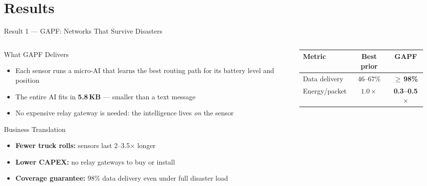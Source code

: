 \documentclass[aspectratio=169,t,10pt]{beamer}
\begin{document}
\section{Results}

\begin{frame}[shrink=5]{Result 1 --- GAPF: Networks That Survive Disasters}
\begin{columns}[T]
\begin{column}{0.50\textwidth}
  \begin{block}{\faBolt\; What GAPF Delivers}
    \begin{itemize}\small\setlength{\itemsep}{3pt}
      \item Each sensor runs a micro-AI that learns
            the best routing path for its battery level and position
      \item The entire AI fits in \textbf{5.8\,KB} ---
            smaller than a text message
      \item No expensive relay gateway is needed:
            the intelligence lives \emph{on} the sensor
    \end{itemize}
  \end{block}
  \vspace{3pt}
  \begin{exampleblock}{\faBriefcase\; Business Translation}
    \begin{itemize}\small\setlength{\itemsep}{2pt}
      \item \textbf{Fewer truck rolls:} sensors last 2--3.5$\times$ longer
      \item \textbf{Lower CAPEX:} no relay gateways to buy or install
      \item \textbf{Coverage guarantee:} 98\% data delivery
            even under full disaster load
    \end{itemize}
  \end{exampleblock}
\end{column}
\begin{column}{0.47\textwidth}
  \centering\small
  \renewcommand{\arraystretch}{1.35}
  \begin{tabular}{lcc}
    \toprule
    \textbf{Metric} & \textbf{Best prior} & \textbf{GAPF} \\
    \midrule
    Data delivery   & 46--67\%      & \textbf{$\geq$\,98\%} \\
    Energy/packet   & $1.0\times$   & \textbf{0.3--0.5$\times$} \\

\end{tabular}
\end{column}
\end{columns}
\end{frame}
\end{document}
